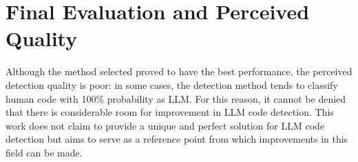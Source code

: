 \section{Final Evaluation and Perceived Quality}
Although the method selected proved to have the best performance, 
the perceived detection quality is poor: in some cases, the detection method 
tends to classify human code with 100\% probability as LLM. For this reason, 
it cannot be denied that there is considerable room for improvement in LLM 
code detection. This work does not claim to provide a unique and perfect solution 
for LLM code detection but aims to serve as a reference point from which 
improvements in this field can be made.